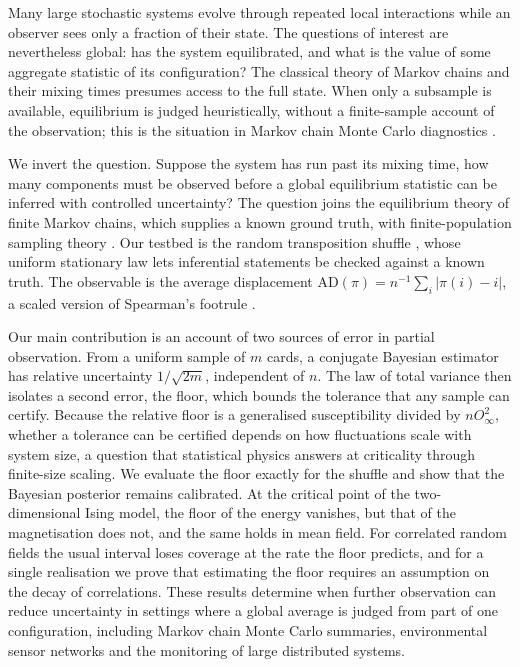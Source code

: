 \documentclass[ba]{imsart}
\theoremstyle{plain}
\theoremstyle{definition}
\newcommand{\AD}{\mathrm{AD}}
\begin{document}
Many large stochastic systems evolve through repeated local interactions while an observer sees only a fraction of their state. The questions of interest are nevertheless global: has the system equilibrated, and what is the value of some aggregate statistic of its configuration? The classical theory of Markov chains and their mixing times \citep{LevinPeresWilmer2009} presumes access to the full state. When only a subsample is available, equilibrium is judged heuristically, without a finite-sample account of the observation; this is the situation in Markov chain Monte Carlo diagnostics \citep{GelmanRubin1992}.

We invert the question. Suppose the system has run past its mixing time, how many components must be observed before a global equilibrium statistic can be inferred with controlled uncertainty? The question joins the equilibrium theory of finite Markov chains, which supplies a known ground truth, with finite-population sampling theory \citep{Cochran1977}. Our testbed is the random transposition shuffle \citep{DiaconisShahshahani1981}, whose uniform stationary law lets inferential statements be checked against a known truth. The observable is the average displacement $\AD(\pi)=n^{-1}\sum_i|\pi(i)-i|$, a scaled version of Spearman's footrule \citep{DiaconisGraham1977}.

Our main contribution is an account of two sources of error in partial observation. From a uniform sample of $m$ cards, a conjugate Bayesian estimator has relative uncertainty $1/\sqrt{2m}$, independent of $n$. The law of total variance then isolates a second error, the floor, which bounds the tolerance that any sample can certify. Because the relative floor is a generalised susceptibility divided by $nO_\infty^2$, whether a tolerance can be certified depends on how fluctuations scale with system size, a question that statistical physics answers at criticality through finite-size scaling. We evaluate the floor exactly for the shuffle and show that the Bayesian posterior remains calibrated. At the critical point of the two-dimensional Ising model, the floor of the energy vanishes, but that of the magnetisation does not, and the same holds in mean field. For correlated random fields the usual interval loses coverage at the rate the floor predicts, and for a single realisation we prove that estimating the floor requires an assumption on the decay of correlations. These results determine when further observation can reduce uncertainty in settings where a global average is judged from part of one configuration, including Markov chain Monte Carlo summaries, environmental sensor networks and the monitoring of large distributed systems.
\end{document}
